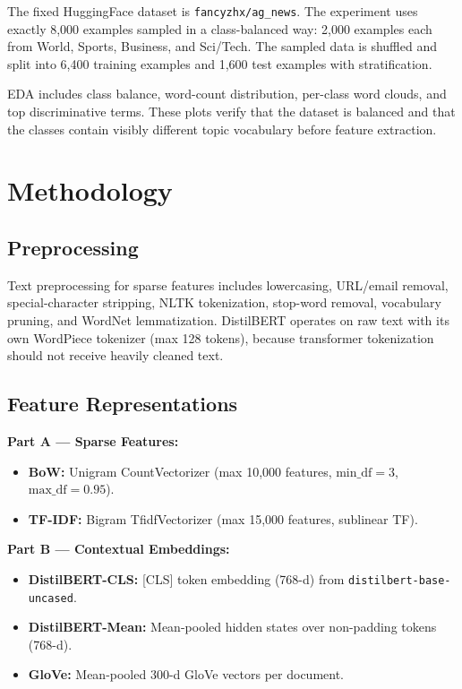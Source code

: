 \documentclass[11pt, a4paper, twocolumn]{article}
\begin{document}
The fixed HuggingFace dataset is \texttt{fancyzhx/ag\_news}. The experiment uses exactly 8,000 examples sampled in a class-balanced way: 2,000 examples each from World, Sports, Business, and Sci/Tech. The sampled data is shuffled and split into 6,400 training examples and 1,600 test examples with stratification.

EDA includes class balance, word-count distribution, per-class word clouds, and top discriminative terms. These plots verify that the dataset is balanced and that the classes contain visibly different topic vocabulary before feature extraction.

\section{Methodology}

\subsection{Preprocessing}
Text preprocessing for sparse features includes lowercasing, URL/email removal, special-character stripping, NLTK tokenization, stop-word removal, vocabulary pruning, and WordNet lemmatization. DistilBERT operates on raw text with its own WordPiece tokenizer (max 128 tokens), because transformer tokenization should not receive heavily cleaned text.

\subsection{Feature Representations}

\textbf{Part A --- Sparse Features:}
\begin{itemize}[leftmargin=*,topsep=2pt,itemsep=1pt]
    \item \textbf{BoW:} Unigram CountVectorizer (max 10,000 features, $\text{min\_df}=3$, $\text{max\_df}=0.95$).
    \item \textbf{TF-IDF:} Bigram TfidfVectorizer (max 15,000 features, sublinear TF).
\end{itemize}

\textbf{Part B --- Contextual Embeddings:}
\begin{itemize}[leftmargin=*,topsep=2pt,itemsep=1pt]
    \item \textbf{DistilBERT-CLS:} [CLS] token embedding (768-d) from \texttt{distilbert-base-uncased}.
    \item \textbf{DistilBERT-Mean:} Mean-pooled hidden states over non-padding tokens (768-d).
    \item \textbf{GloVe:} Mean-pooled 300-d GloVe vectors per document.
\end{itemize}
\end{document}
